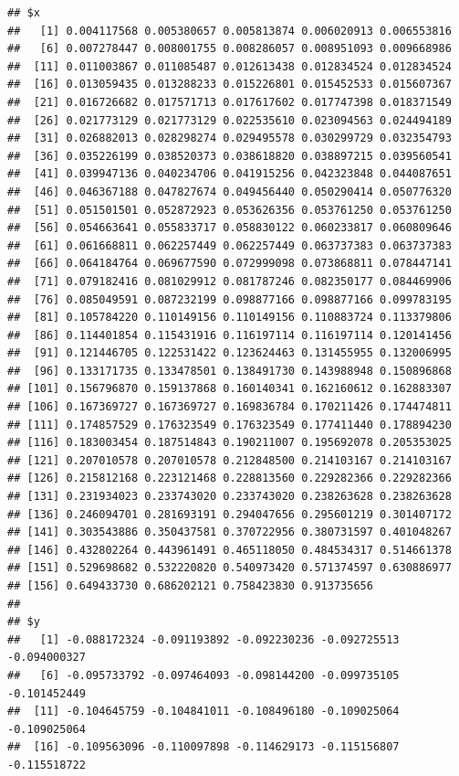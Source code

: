 \documentclass{article}\usepackage[]{graphicx}\usepackage[]{color}
\makeatletter
\newenvironment{kframe}{%
 \def\at@end@of@kframe{}%
 \ifinner\ifhmode%
  \def\at@end@of@kframe{\end{minipage}}%
  \begin{minipage}{\columnwidth}%
 \fi\fi%
 \def\FrameCommand##1{\hskip\@totalleftmargin \hskip-\fboxsep
 \colorbox{shadecolor}{##1}\hskip-\fboxsep
     \hskip-\linewidth \hskip-\@totalleftmargin \hskip\columnwidth}%
 \MakeFramed {\advance\hsize-\width
   \@totalleftmargin\z@ \linewidth\hsize
   \@setminipage}}%
 {\par\unskip\endMakeFramed%
 \at@end@of@kframe}
\newenvironment{knitrout}{}{} %
\makeatother
\begin{document}
\begin{enumerate}[(a)]
\begin{knitrout}
\begin{kframe}
\begin{alltt}
\end{alltt}
\begin{verbatim}
## $x
##   [1] 0.004117568 0.005380657 0.005813874 0.006020913 0.006553816
##   [6] 0.007278447 0.008001755 0.008286057 0.008951093 0.009668986
##  [11] 0.011003867 0.011085487 0.012613438 0.012834524 0.012834524
##  [16] 0.013059435 0.013288233 0.015226801 0.015452533 0.015607367
##  [21] 0.016726682 0.017571713 0.017617602 0.017747398 0.018371549
##  [26] 0.021773129 0.021773129 0.022535610 0.023094563 0.024494189
##  [31] 0.026882013 0.028298274 0.029495578 0.030299729 0.032354793
##  [36] 0.035226199 0.038520373 0.038618820 0.038897215 0.039560541
##  [41] 0.039947136 0.040234706 0.041915256 0.042323848 0.044087651
##  [46] 0.046367188 0.047827674 0.049456440 0.050290414 0.050776320
##  [51] 0.051501501 0.052872923 0.053626356 0.053761250 0.053761250
##  [56] 0.054663641 0.055833717 0.058830122 0.060233817 0.060809646
##  [61] 0.061668811 0.062257449 0.062257449 0.063737383 0.063737383
##  [66] 0.064184764 0.069677590 0.072999098 0.073868811 0.078447141
##  [71] 0.079182416 0.081029912 0.081787246 0.082350177 0.084469906
##  [76] 0.085049591 0.087232199 0.098877166 0.098877166 0.099783195
##  [81] 0.105784220 0.110149156 0.110149156 0.110883724 0.113379806
##  [86] 0.114401854 0.115431916 0.116197114 0.116197114 0.120141456
##  [91] 0.121446705 0.122531422 0.123624463 0.131455955 0.132006995
##  [96] 0.133171735 0.133478501 0.138491730 0.143988948 0.150896868
## [101] 0.156796870 0.159137868 0.160140341 0.162160612 0.162883307
## [106] 0.167369727 0.167369727 0.169836784 0.170211426 0.174474811
## [111] 0.174857529 0.176323549 0.176323549 0.177411440 0.178894230
## [116] 0.183003454 0.187514843 0.190211007 0.195692078 0.205353025
## [121] 0.207010578 0.207010578 0.212848500 0.214103167 0.214103167
## [126] 0.215812168 0.223121468 0.228813560 0.229282366 0.229282366
## [131] 0.231934023 0.233743020 0.233743020 0.238263628 0.238263628
## [136] 0.246094701 0.281693191 0.294047656 0.295601219 0.301407172
## [141] 0.303543886 0.350437581 0.370722956 0.380731597 0.401048267
## [146] 0.432802264 0.443961491 0.465118050 0.484534317 0.514661378
## [151] 0.529698682 0.532220820 0.540973420 0.571374597 0.630886977
## [156] 0.649433730 0.686202121 0.758423830 0.913735656
## 
## $y
##   [1] -0.088172324 -0.091193892 -0.092230236 -0.092725513 -0.094000327
##   [6] -0.095733792 -0.097464093 -0.098144200 -0.099735105 -0.101452449
##  [11] -0.104645759 -0.104841011 -0.108496180 -0.109025064 -0.109025064
##  [16] -0.109563096 -0.110097898 -0.114629173 -0.115156807 -0.115518722

\end{verbatim}
\end{kframe}
\end{knitrout}
\end{enumerate}
\end{document}
